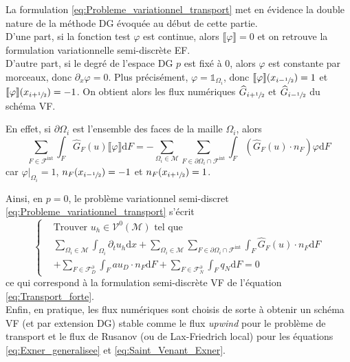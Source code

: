 \documentclass[11pt, a4paper, oneside]{report}
\newcommand{\restricdynamic}[2]{\left.#1\right\vert_{#2}}
\begin{document}
\begin{appendices}
La formulation \eqref{eq:Probleme_variationnel_transport} met en évidence la double nature de la méthode DG évoquée au début de cette partie. \\
D'une part, si la fonction test $\varphi$ est continue, alors $\llbracket \varphi \rrbracket = 0$ et on retrouve la formulation variationnelle semi-discrète EF. \\
D'autre part, si le degré de l'espace DG $p$ est fixé à 0, alors $\varphi$ est constante par morceaux, donc $\partial_x \varphi = 0$. Plus précisément, $\varphi = \mathds{1}_{\Omega_i}$, donc $\llbracket \varphi \rrbracket(x_{i - \sfrac{1}{2}}) = 1$ et $\llbracket \varphi \rrbracket(x_{i + \sfrac{1}{2}}) = -1$. On obtient alors les flux numériques $\widehat{G}_{i + \sfrac{1}{2}}$ et $\widehat{G}_{i - \sfrac{1}{2}}$ du schéma VF. \\
\begin{samepage}
    En effet, si $\partial \Omega_i$ est l'ensemble des faces de la maille $\Omega_i$, alors
    \begin{equation}
        \sum_{F \in \mathcal{F}^\text{int}} \int_F \widehat{G}_F(u) \llbracket \varphi \rrbracket \text{d}F = - \sum_{\Omega_i \in \mathcal{M}} \sum_{F \in \partial \Omega_i \cap \mathcal{F}^\text{int}} \int_F (\widehat{G}_F(u) \cdot n_F) \varphi \text{d}F
    \end{equation}
    car $\restricdynamic{\varphi}{\Omega_i} = 1$, $n_F(x_{i-\sfrac{1}{2}}) = -1$ et $n_F(x_{i+\sfrac{1}{2}}) = 1$.
\end{samepage}

Ainsi, en $p = 0$, le problème variationnel semi-discret \eqref{eq:Probleme_variationnel_transport} s'écrit
\begin{equation}
    \left \{
    \begin{aligned}
        &\text{Trouver } u_h \in \mathcal{V}^0(\mathcal{M}) \text{ tel que} \\
        &\sum_{\Omega_i \in \mathcal{M}} \int_{\Omega_i} \partial_t u_h \text{d}x + \sum_{\Omega_i \in \mathcal{M}} \sum_{F \in \partial \Omega_i \cap \mathcal{F}^\text{int}} \int_F \widehat{G}_F(u) \cdot n_F \text{d}F \\
        &+ \sum_{F \in \mathcal{F}_D^\partial} \int_F a u_D \cdot n_F \text{d}F + \sum_{F \in \mathcal{F}_N^\partial} \int_F q_N \text{d}F = 0
    \end{aligned}
    \right .
\end{equation}
ce qui correspond à la formulation semi-discrète VF de l'équation \eqref{eq:Transport_forte}. \\
Enfin, en pratique, les flux numériques sont choisis de sorte à obtenir un schéma VF (et par extension DG) stable comme le flux \textit{upwind} pour le problème de transport et le flux de Rusanov (ou de Lax-Friedrich local) pour les équations \eqref{eq:Exner_generalisee} et \eqref{eq:Saint_Venant_Exner}. \\


\end{appendices}
\end{document}
